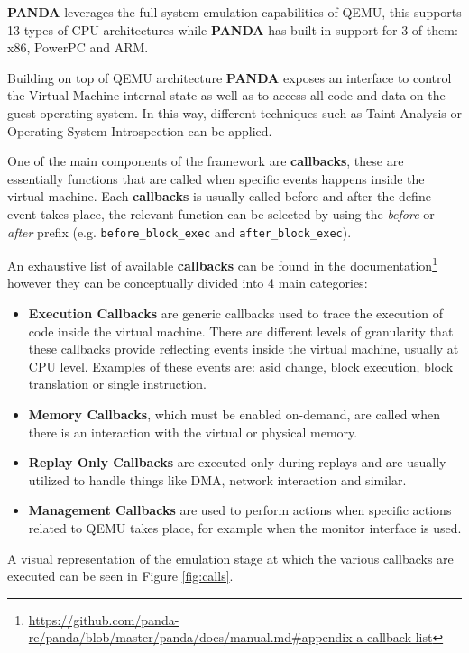 \textbf{PANDA} leverages the full system emulation capabilities of QEMU, this supports 13 types of CPU architectures while \textbf{PANDA} has built-in support for 3 of them: x86, PowerPC and ARM. 

Building on top of QEMU architecture \textbf{PANDA} exposes an interface to control the Virtual Machine internal state as well as to access all code and data on the guest operating system. In this way, different techniques such as Taint Analysis or Operating System Introspection can be applied.

One of the main components of the framework are \textbf{callbacks}, these are essentially functions that are called when specific events happens inside the virtual machine. Each \textbf{callbacks} is usually called before and after the define event takes place, the relevant function can be selected by using the \textit{before} or \textit{after} prefix (e.g. \lstinline{before_block_exec} and \lstinline{after_block_exec}).

An exhaustive list of available \textbf{callbacks} can be found in the documentation\footnote{\url{https://github.com/panda-re/panda/blob/master/panda/docs/manual.md\#appendix-a-callback-list}} however they can be conceptually divided into 4 main categories:

\begin{itemize}
    \item \textbf{Execution Callbacks} are generic callbacks used to trace the execution of code inside the virtual machine. There are different levels of granularity that these callbacks provide reflecting events inside the virtual machine, usually at CPU level. Examples of these events are: asid change, block execution, block translation or single instruction.
    \item \textbf{Memory Callbacks}, which must be enabled on-demand, are called when there is an interaction with the virtual or physical memory. 
    \item \textbf{Replay Only Callbacks} are executed only during replays and are usually utilized to handle things like DMA, network interaction and similar.
    \item \textbf{Management Callbacks} are used to perform actions when specific actions related to QEMU takes place, for example when the monitor interface is used.
\end{itemize}

A visual representation of the emulation stage at which the various callbacks are executed can be seen in Figure \ref{fig:calls}.

